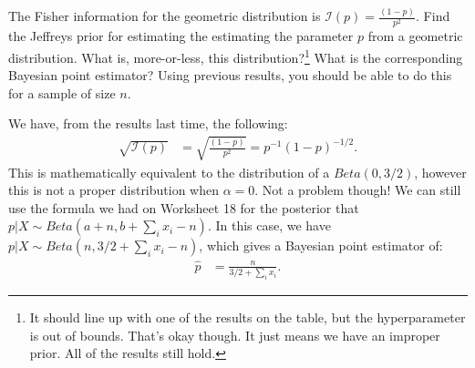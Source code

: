 
The Fisher information for the geometric distribution is $\mathcal{I}(p) = \frac{(1-p)}{p^2}$.
Find the Jeffreys prior for estimating the estimating the parameter $p$ from
a geometric distribution. What is, more-or-less, this distribution?\footnote{
  It should line up with one of the results on the table, but the hyperparameter
  is out of bounds. That's okay though. It just means we have an improper prior.
  All of the results still hold. 
} What is the corresponding Bayesian point estimator? Using previous results,
you should be able to do this for a sample of size $n$.


We have, from the results last time, the following:
\begin{align*}
\sqrt{\mathcal{I}(p)} &= \sqrt{\frac{(1-p)}{p^2}} = p^{-1} (1 - p)^{-1/2}.
\end{align*}
This is mathematically equivalent to the distribution of a $Beta(0, 3/2)$,
however this is not a proper distribution when $\alpha = 0$. Not a problem
though! We can still use the formula we had on Worksheet 18 for the posterior
that  $p | X \sim Beta(a + n, b + \sum_i x_i - n)$. In this case, we have
$p | X \sim Beta(n, 3/2 + \sum_i x_i - n)$, which gives a Bayesian point
estimator of:
\begin{align*}
\widehat{p} &= \frac{n}{3/2 + \sum_i x_i}.
\end{align*}
